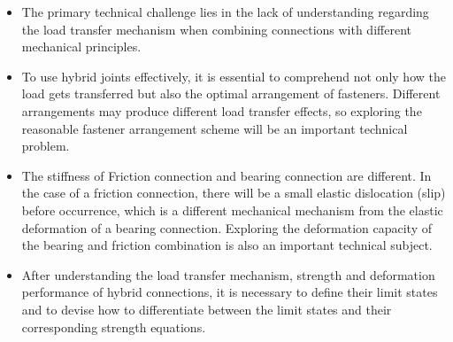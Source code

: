 \begin{itemize}
    \item The primary technical challenge lies in the lack of understanding regarding the load transfer mechanism when combining connections with different mechanical principles.
    \item To use hybrid joints effectively, it is essential to comprehend not only how the load gets transferred but also the optimal arrangement of fasteners. Different arrangements may produce different load transfer effects, so exploring the reasonable fastener arrangement scheme will be an important technical problem.
    \item The stiffness of Friction connection and bearing connection are different. In the case of a friction connection, there will be a small elastic dislocation (slip) before occurrence, which is a different mechanical mechanism from the elastic deformation of a bearing connection. Exploring the deformation capacity of the bearing and friction combination is also an important technical subject.
    \item After understanding the load transfer mechanism, strength and deformation performance of hybrid connections, it is necessary to define their limit states and to devise how to differentiate between the limit states and their corresponding strength equations.
    
\end{itemize}









